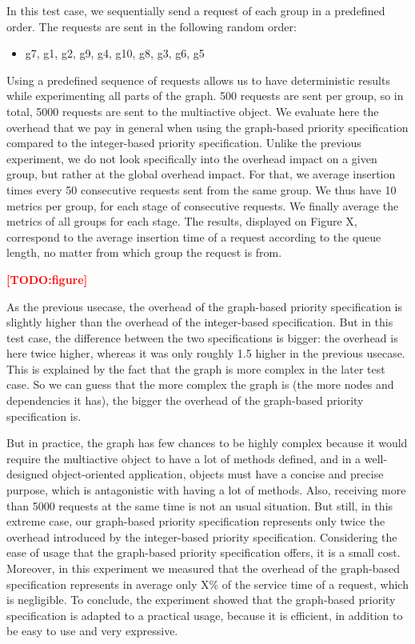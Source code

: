 \documentclass[11pt]{report}
\newcommand{\TODO}[1]{\textcolor{red}{\textbf{[TODO:#1]}}}
\begin{document}
In this test case, we sequentially send a request of each group in a predefined order. The requests are sent in the following random order:
\begin{itemize}
\item g7, g1, g2, g9, g4, g10, g8, g3, g6, g5
\end{itemize}
Using a predefined sequence of requests allows us to have deterministic results while experimenting all parts of the graph. 500 requests are sent per group, so in total, 5000 requests are sent to the multiactive object. 
We evaluate here the overhead that we pay in general when using the graph-based priority specification compared to the integer-based priority specification. Unlike the previous experiment, we do not look specifically into the overhead impact on a given group, but rather at the global overhead impact. For that, we average insertion times every 50 consecutive requests sent from the same group. We thus have 10 metrics per group, for each stage of consecutive requests. We finally average the metrics of all groups for each stage. The results, displayed on Figure X, correspond to the average insertion time of a request according to the queue length, no matter from which group the request is from.

\TODO{figure}

As the previous usecase, the overhead of the graph-based priority specification is slightly higher than the overhead of the integer-based specification. But in this test case, the difference between the two specifications is bigger: the overhead is here twice higher, whereas it was only roughly 1.5 higher in the previous usecase.
This is explained by the fact that the graph is more complex in the later test case. So we can guess that the more complex the graph is (the more nodes and dependencies it has), the bigger the overhead of the graph-based priority specification is.

But in practice, the graph has few chances to be highly complex because it would require the multiactive object to have a lot of methods defined, and in a well-designed object-oriented application, objects must have a concise and precise purpose, which is antagonistic with having a lot of methods. Also, receiving more than 5000 requests at the same time is not an usual situation. But still, in this extreme case, our graph-based priority specification represents only twice the overhead introduced by the integer-based priority specification. Considering the ease of usage that the graph-based priority specification offers, it is a small cost. Moreover, in this experiment we measured that the overhead of the graph-based specification represents in average only X\% of the service time of a request, which is negligible. To conclude, the experiment showed that the graph-based priority specification is adapted to a practical usage, because it is efficient, in addition to be easy to use and very expressive. 
\end{document}

